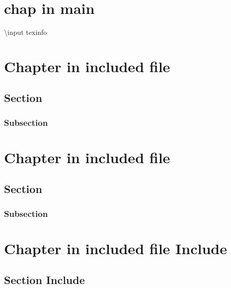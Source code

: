 \documentclass{book}
\newcommand{\Texinfotheinclude}{}%
\renewcommand{\_}{\Texinfounderscore\discretionary{}{}{}}
\begin{document}
\tableofcontents\newpage
\label{anchor:Top}%
\chapter{{chap in main}}
\label{anchor:in-main}%

\renewcommand{\Texinfotheinclude}{section\_file.texi}%
\textbackslash{}input texinfo 

\chapter{{Chapter in included file}}
\label{anchor:Chapter-in-included-file}%


\section{{Section}}
\label{anchor:Section}%


\subsection{{Subsection}}
\label{anchor:Subsection}%

\renewcommand{\Texinfotheinclude}{}%

\renewcommand{\Texinfotheinclude}{section\_file\_no\_node.texi}%


\chapter{{Chapter in included file}}

\section{{Section}}

\subsection{{Subsection}}

\renewcommand{\Texinfotheinclude}{}%

\renewcommand{\Texinfotheinclude}{section\_file\_no\_node\_include.texi}%


\chapter{{Chapter in included file Include}}

\section{{Section Include}}
\end{document}
